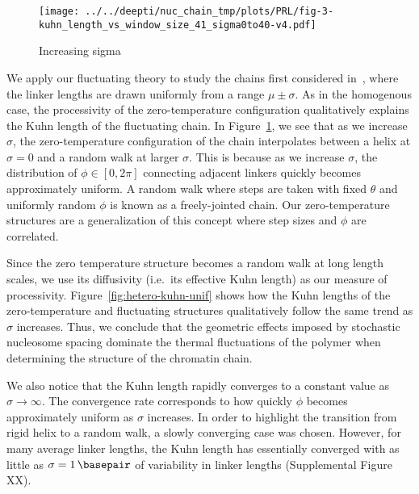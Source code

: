 \documentclass[%
 reprint,
superscriptaddress,
showpacs,preprintnumbers,
 amsmath,amssymb,
 aps,
 prl,
]{revtex4-1}
\begin{document}
\begin{figure}
    \centering
    \texttt{[image: ../../deepti/nuc\_chain\_tmp/plots/PRL/fig-3-kuhn\_length\_vs\_window\_size\_41\_sigma0to40-v4.pdf]}
    \caption{Increasing sigma}\label{fig:hetero-geom}
\end{figure}

We apply our fluctuating theory to study the chains first considered
    in~\cite{woodcock1993}, where the linker lengths are drawn uniformly from a
    range $\mu \pm \sigma$.
As in the homogenous case, the processivity of the zero-temperature
    configuration qualitatively explains the Kuhn length of the fluctuating chain.
In Figure~\ref{fig:hetero-geom}, we see that as we increase $\sigma$, the
    zero-temperature configuration of the chain interpolates between a helix at
    $\sigma = 0$ and a random walk at larger $\sigma$.
This is because as we increase $\sigma$, the distribution of $\phi \in [0, 2\pi]$ connecting
    adjacent linkers quickly becomes approximately uniform.
A random walk where steps are taken with fixed $\theta$ and uniformly
    random $\phi$ is known as a freely-jointed chain.
Our zero-temperature structures are a generalization of this concept where step
    sizes and $\phi$ are correlated.

Since the zero temperature structure becomes a random walk at long length
    scales, we use its diffusivity (i.e.\ its effective Kuhn length) as our
    measure of processivity.
Figure~\ref{fig:hetero-kuhn-unif} shows how the Kuhn lengths of the
zero-temperature and fluctuating structures qualitatively follow the same trend
as $\sigma$ increases.
Thus, we conclude that the geometric effects imposed by
    stochastic nucleosome spacing dominate the thermal fluctuations of the
    polymer when determining the structure of the chromatin chain.

We also notice that the Kuhn length rapidly converges to
a constant value as $\sigma\to\infty$.
The convergence rate corresponds to how quickly $\phi$ becomes approximately
    uniform as $\sigma$ increases.
In order to highlight the transition from rigid helix to a random walk, a slowly
    converging case was chosen.
However, for many average linker lengths, the Kuhn length has essentially
    converged with as little as $\sigma = \SI{1}{\basepair}$ of variability in
    linker lengths (Supplemental Figure XX).
\end{document}
